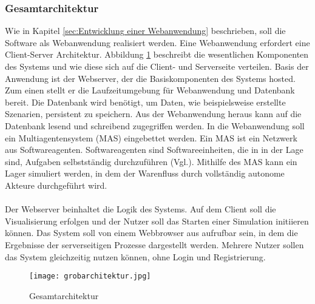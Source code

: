 \subsubsection{Gesamtarchitektur}\label{GA} 
Wie in Kapitel \ref{sec:Entwicklung einer Webanwendung} beschrieben, soll die Software als Webanwendung realisiert werden. Eine Webanwendung erfordert eine Client-Server Architektur. Abbildung \ref{Gesamtarchitektur} beschreibt die wesentlichen Komponenten des Systems und wie diese sich auf die Client- und Serverseite verteilen. Basis der Anwendung ist der Webserver, der die Basiskomponenten des Systems hosted. Zum einen stellt er die Laufzeitumgebung für Webanwendung und Datenbank bereit. Die Datenbank wird benötigt, um Daten, wie beispielsweise erstellte Szenarien, persistent zu speichern. Aus der Webanwendung heraus kann auf die Datenbank lesend und schreibend zugegriffen werden. In die Webanwendung soll ein Multiagentensystem (MAS) eingebettet werden. Ein MAS ist ein Netzwerk aus Softwareagenten. Softwareagenten sind Softwareeinheiten, die in in der Lage sind, Aufgaben selbstständig durchzuführen (Vgl.\cite{mas}). Mithilfe des MAS kann ein Lager simuliert werden, in dem der Warenfluss durch vollständig autonome Akteure durchgeführt wird. 
\\\\
Der Webserver beinhaltet die Logik des Systems. Auf dem Client soll die Visualisierung erfolgen und der Nutzer soll das Starten einer Simulation initiieren können. Das System soll von einem Webbrowser aus aufrufbar sein, in dem die Ergebnisse der serverseitigen Prozesse dargestellt werden. Mehrere Nutzer sollen das System gleichzeitig nutzen können, ohne Login und Registrierung.

\begin{figure}[h!]
	\centering
		\texttt{[image: grobarchitektur.jpg]}        
		\caption{Gesamtarchitektur}
	\label{Gesamtarchitektur}
\end{figure} 
\newpage
